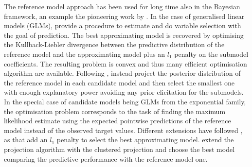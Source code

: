 \documentclass[american,]{article}
\theoremstyle{definition}
\begin{document}
The reference model approach has been used for long time also in the Bayesian framework, an example the pioneering work by \cite{paper:reference_lindley}. In the case of generalised linear models (GLMs), \cite{paper:tran_predictivelasso} provide a procedure to estimate and do variable selection with the goal of prediction. The best approximating model is recovered by optimising the Kullback-Liebler divergence between the predictive distribution of the reference model and the approximating model plus an $l_{1}$ penalty on the submodel coefficients. The resulting problem is convex and thus many efficient optimisation algorithm are available. Following \cite{paper:goutis_projection}, \cite{paper:original_proj}  instead project the posterior distribution of the reference model in each candidate model and then select the smallest one with enough explanatory power avoiding any prior elicitation for the submodels. In the special case of candidate models being GLMs from the exponential family, the optimisation problem corresponds to the task of finding the maximum likelihood estimate using the expected pointwise predictions of the reference model instead of the observed target values. Different extensions have followed \cite{paper:original_proj}, as \cite{paper:nott_projection} that add an $l_{1}$ penalty to select the best approximating model. \cite{paper:projpred} extend the projection algorithm with the clustered projection and choose the best model comparing the predictive performance with the reference model one.

\end{document}
